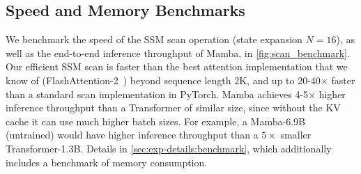 \subsection{Speed and Memory Benchmarks}
\label{sec:exp:benchmark}


We benchmark the speed of the SSM scan operation (state expansion $N=16$), as well as the end-to-end
inference throughput of Mamba, in \cref{fig:scan_benchmark}.
Our efficient SSM scan is faster than the best attention implementation that we know of
(FlashAttention-2~\citep{dao2023flashattention2}) beyond sequence length 2K,
and up to 20-40$\times$ faster than a standard scan implementation in
PyTorch.
Mamba achieves 4-5$\times$ higher inference throughput than a Transformer of similar
size, since without the KV cache it can use much higher batch sizes.
For example, a Mamba-6.9B (untrained) would have higher inference throughput than a
$5\times$ smaller Transformer-1.3B.
Details in \cref{sec:exp-details:benchmark}, which additionally includes a benchmark of memory consumption.
